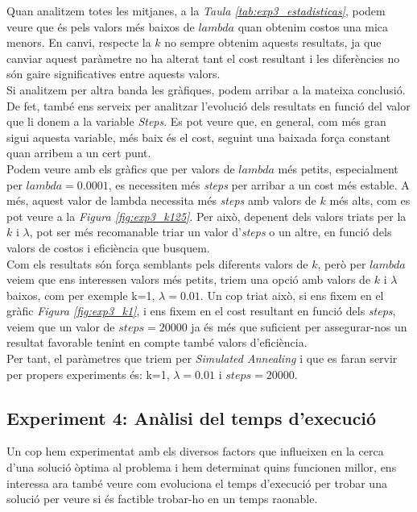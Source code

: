 \documentclass[a4paper]{article}
\begin{document}
	Quan analitzem totes les mitjanes, a la \textit{Taula \ref{tab:exp3_estadisticas}}, podem veure que és pels valors més baixos de $lambda$ quan obtenim costos una mica menors. En canvi, respecte la $k$ no sempre obtenim aquests resultats, ja que canviar aquest paràmetre no ha alterat tant el cost resultant i les diferències no són gaire significatives entre aquests valors. \\
	
	Si analitzem per altra banda les gràfiques, podem arribar a la mateixa conclusió. De fet, també ens serveix per analitzar l'evolució dels resultats en funció del valor que li donem a la variable \textit{Steps}. Es pot veure que, en general, com més gran sigui aquesta variable, més baix és el cost, seguint una baixada força constant quan arribem a un cert punt. \\
	
	Podem veure amb els gràfics que per valors de $lambda$ més petits, especialment per $lambda=0.0001$, es necessiten més \textit{steps} per arribar a un cost més estable. A més, aquest valor de lambda necessita més \textit{steps} amb valors de $k$ més alts, com es pot veure a la \textit{Figura \ref{fig:exp3_k125}}. Per això, depenent dels valors triats per la $k$ i $\lambda$, pot ser més recomanable triar un valor d'\textit{steps} o un altre, en funció dels valors de costos i eficiència que busquem. \\
	
	Com els resultats són força semblants pels diferents valors de $k$, però per $lambda$ veiem que ens interessen valors més petits, triem una opció amb valors de $k$ i $\lambda$ baixos, com per exemple k=1, $\lambda=0.01$. Un cop triat això, si ens fixem en el gràfic \textit{Figura \ref{fig:exp3_k1}}, i ens fixem en el cost resultant en funció dels \textit{steps}, veiem que un valor de $steps=20000$ ja és més que suficient per assegurar-nos un resultat favorable tenint en compte també valors d'eficiència. \\
	
	Per tant, el paràmetres que triem per \textit{Simulated Annealing} i que es faran servir per propers experiments és: k=1, $\lambda = 0.01$ i $steps = 20000$.
	
	
	\subsection{Experiment 4: Anàlisi del temps d'execució}
	\label{sec:exp4}
	
	Un cop hem experimentat amb els diversos factors que influeixen en la cerca d'una solució òptima al problema i hem determinat quins funcionen millor, ens interessa ara també veure com evoluciona el temps d'execució per trobar una solució per veure si és factible trobar-ho en un temps raonable.\\
	
\end{document}
